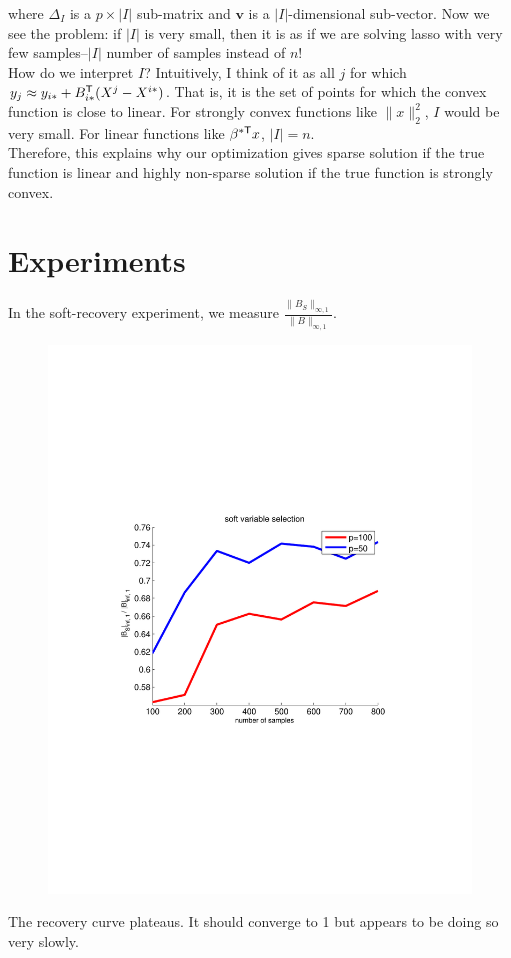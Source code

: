 \documentclass{article}
\begin{document}
where $\Delta_I$ is a $p \times |I|$ sub-matrix and $\mathbf{v}$ is a $|I|$-dimensional sub-vector. Now we see the problem: if $|I|$ is very small, then it is as if we are solving lasso with very few samples--$|I|$ number of samples instead of $n$!\\

How do we interpret $I$? Intuitively, I think of it as all $j$ for which $y_j \approx y_{i*} + B_{i*}^{\mathsf{T}} (X^j - X^{i*})$. That is, it is the set of points for which the convex function is close to linear. For strongly convex functions like $\|x\|^2_2$, $I$ would be very small. For linear functions like $\beta^{*\mathsf{T}} x$, $|I| = n$. \\

Therefore, this explains why our optimization gives sparse solution if the true function is linear and highly non-sparse solution if the true function is strongly convex.

\section{Experiments}

In the soft-recovery experiment, we measure $\frac{ \| B_S \|_{\infty,1}}{\|B\|_{\infty, 1}}$.
\begin{figure}
\includegraphics[trim=150 200 150 200]{../code/figs/soft_recovery.pdf}
\end{figure}
The recovery curve plateaus. It should converge to 1 but appears to be doing so very slowly.
\end{document}
